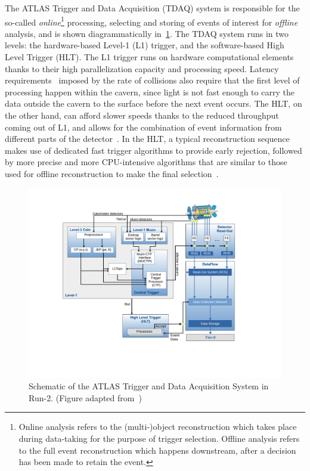 The ATLAS Trigger and Data Acquisition (TDAQ) system is responsible for the so-called \textit{online}\footnote{\label{foot:offline} Online analysis refers to the (multi-)object reconstruction which takes place during data-taking for the purpose of trigger selection. Offline analysis refers to the full event reconstruction which happens downstream, after a decision has been made to retain the event.} processing, selecting and storing of events of interest for \textit{offline} analysis, and is shown diagrammatically in~\cref{fig:tdaq}. The TDAQ system runs in two levels: the hardware-based Level-1 (L1) trigger, and the software-based High Level Trigger (HLT). The L1 trigger runs on hardware computational elements thanks to their high parallelization capacity and processing speed. Latency requirements~\cite{ATLAS_TDAQ} imposed by the rate of collisions also require that the first level of processing happen within the cavern, since light is not fast enough to carry the data outside the cavern to the surface before the next event occurs. The HLT, on the other hand, can afford slower speeds thanks to the reduced throughput coming out of L1, and allows for the combination of event information from different parts of the detector~\cite{ATLAS_TDAQ}. In the HLT, a typical reconstruction sequence makes use of dedicated fast trigger algorithms to provide early rejection, followed by more precise and more CPU-intensive algorithms that are similar to those used for offline reconstruction to make the final selection~\cite{ATLAS_TDAQ}.

\begin{figure}[!ht]
    \centering
    \includegraphics[width=0.7\linewidth]{figures//experiment/TDAQSystem.pdf}
    \caption{Schematic of the ATLAS Trigger and Data Acquisition System in Run-2. (Figure adapted from~\cite{ATLAS_TDAQ})}
    \label{fig:tdaq}
\end{figure}

